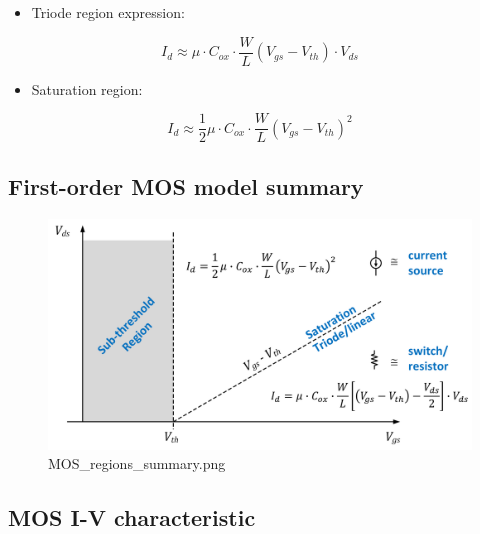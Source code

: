 \documentclass[11pt]{article}
\providecommand{\tightlist}{%
      \setlength{\itemsep}{0pt}\setlength{\parskip}{0pt}}
\begin{document}
    \begin{itemize}
\tightlist
\item
  Triode region expression:
\end{itemize}

\begin{equation}
I_d \approx \mu \cdot C_{ox} \cdot \dfrac{W}{L} {(V_{gs} - V_{th})\cdot V_{ds}}
\end{equation}

\begin{itemize}
\tightlist
\item
  Saturation region:
\end{itemize}

\begin{equation}
I_d \approx \dfrac{1}{2}\mu\cdot C_{ox} \cdot \dfrac{W}{L}(V_{gs}-V_{th})^2
\end{equation}

    \hypertarget{first-order-mos-model-summary}{%
\subsection{First-order MOS model
summary}\label{first-order-mos-model-summary}}

    \begin{figure}
\centering
\includegraphics{MOS_regions_summary.png}
\caption{MOS\_regions\_summary.png}
\end{figure}

    \hypertarget{mos-i-v-characteristic}{%
\subsection{MOS I-V characteristic}\label{mos-i-v-characteristic}}
\end{document}
